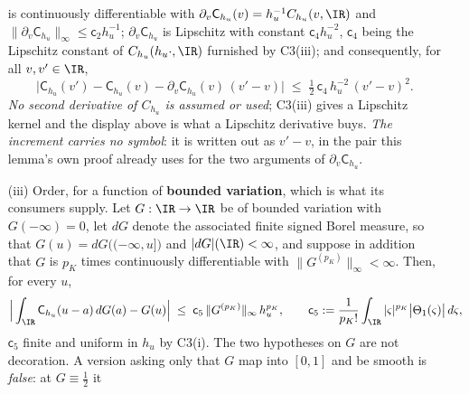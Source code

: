 \begin{lemma}
\begin{enumerate}
is continuously differentiable with $\partial_v\mathsf C_{h_u}(v)=h_u^{-1}C_{h_u}(v,\IR)$ and
$\|\partial_v\mathsf C_{h_u}\|_\infty\le\mathsf c_2h_u^{-1}$; $\partial_v\mathsf C_{h_u}$ is Lipschitz
with constant $\mathsf c_4h_u^{-2}$, $\mathsf c_4$ being the Lipschitz constant of
$C_{h_u}(h_u\cdot,\IR)$ furnished by C3(iii); and consequently, for all $v,v'\in\IR$,
\[
\big|\mathsf C_{h_u}(v')-\mathsf C_{h_u}(v)-\partial_v\mathsf C_{h_u}(v)\,(v'-v)\big|
\;\le\;\tfrac12\,\mathsf c_4\,h_u^{-2}\,(v'-v)^{2} .
\]
\emph{No second derivative of $C_{h_u}$ is assumed or used}; C3(iii) gives a Lipschitz kernel and the
display above is what a Lipschitz derivative buys. \emph{The increment carries no symbol}: it is written
out as $v'-v$, in the pair this lemma's own proof already uses for the two arguments of
$\partial_v\mathsf C_{h_u}$.
\item[(iii)] Order, for a function of \textbf{bounded variation}, which is what its
consumers supply. Let $G:\IR\to\IR$ be of bounded variation
with $G(-\infty)=0$, let $dG$ denote the associated finite signed Borel measure, so that
$G(u)=dG\big((-\infty,u]\big)$ and $|dG|(\IR)<\infty$, and suppose in addition that $G$ is $p_K$ times
continuously differentiable with $\|G^{(p_K)}\|_\infty<\infty$. Then, for every $u$,
\[
\Big|\int_{\IR}\mathsf C_{h_u}(u-a)\,dG(a)-G(u)\Big|
\;\le\;\mathsf c_5\,\|G^{(p_K)}\|_\infty\,h_u^{p_K},
\qquad
\mathsf c_5:=\frac1{p_K!}\int_{\IR}|\varsigma|^{p_K}\big|\Theta_1(\varsigma)\big|\,d\varsigma ,
\]
$\mathsf c_5$ finite and uniform in $h_u$ by C3(i). The two hypotheses on $G$ are not decoration.
A version asking only that $G$ map into $[0,1]$ and be smooth is \emph{false}: at $G\equiv\tfrac12$ it

\end{enumerate}
\end{lemma}
